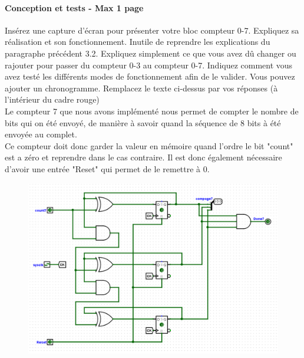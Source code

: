 \documentclass[a4paper]{article} %
\begin{document}
\begin{tcolorbox}[colframe=Monokaimagenta,colback=white, breakable, enhanced]
\paragraph{Conception et tests - Max 1 page}
Insérez une capture d’écran pour présenter votre bloc compteur 0-7. Expliquez sa réalisation et son fonctionnement. Inutile de reprendre les explications du paragraphe précédent 3.2. Expliquez simplement ce que vous avez dû changer ou rajouter pour passer du compteur 0-3 au compteur 0-7.
Indiquez comment vous avez testé les différents modes de fonctionnement afin de le valider. Vous pouvez ajouter un chronogramme.
Remplacez le texte ci-dessus par vos réponses (à l’intérieur du cadre rouge)\\

Le compteur 7 que nous avons implémenté nous permet de compter le nombre de bits qui on été envoyé, de manière à savoir quand la séquence de 8 bits à été envoyée au complet.\\
Ce compteur doit donc garder la valeur en mémoire quand l'ordre le bit "count" est a zéro et reprendre dans le cas contraire. Il est donc également nécessaire d'avoir une entrée "Reset" qui permet de le remettre à 0.\\
\begin{figure}[H]
	\centering
	\includegraphics[width=\textwidth]{src/CPT_07}
	\label{fig:CPT_07}
\end{figure}
	

\end{tcolorbox}
\end{document}
